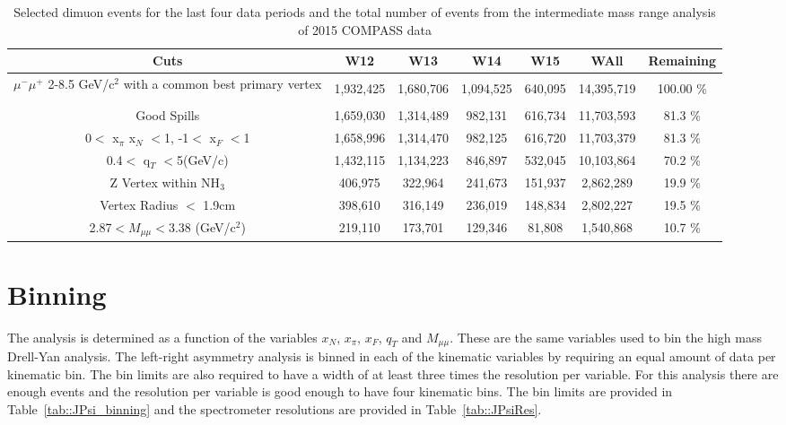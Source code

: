 \begin{table}[h!t]
  \begin{tabular}{ |c|c|c|c|c|c|c| }
    \hline \textbf{Cuts}& \textbf{W12}& \textbf{W13}& \textbf{W14}&
    \textbf{W15} & \textbf{WAll} & \textbf{Remaining} \\ \hline

    \multirow{3}{9em}{$\mu^-\mu^+$ 2-8.5 GeV/c$^2$ with a common best primary
      vertex}& & & & & & \\
    &1,932,425& 1,680,706& 1,094,525& 640,095& 14,395,719&
    100.00 \% \\ & & & & & & \\ \hline

    Good Spills& 1,659,030& 1,314,489& 982,131& 616,734& 11,703,593&
    81.3 \% \\ \hline

    0$<$ x$_{\pi}$ x$_N$ $<$1, -1$<$ x$_F$ $<$1&
    1,658,996& 1,314,470& 982,125& 616,720& 11,703,379&	81.3 \% \\ \hline

    0.4$<$ q$_T$ $<$5(GeV/c)&
    1,432,115& 1,134,223& 846,897& 532,045& 10,103,864&	70.2 \% \\ \hline

    Z Vertex within NH$_3$&
    406,975& 322,964& 241,673& 151,937&	2,862,289& 19.9  \% \\ \hline

    Vertex Radius $<$ 1.9cm&
    398,610& 316,149& 236,019& 148,834& 2,802,227& 19.5  \% \\ \hline

    2.87$< M_{\mu\mu} <$3.38 (GeV/c$^2$)&
    219,110& 173,701& 129,346& 81,808& 1,540,868& 10.7  \% \\ \hline
    
  \end{tabular}
  \caption{Selected dimuon events for the last four data periods and the total
    number of events from the intermediate mass range analysis of 2015 COMPASS
    data}
  \label{tab::JPsiStats2}
\end{table}


\section{Binning}

The analysis is determined as a function of the variables $x_N$, $x_{\pi}$,
$x_F$, $q_T$ and $M_{\mu\mu}$.  These are the same variables used to bin the
high mass Drell-Yan analysis.  The left-right asymmetry analysis is binned in
each of the kinematic variables by requiring an equal amount of data per
kinematic bin.  The bin limits are also required to have a width of at least
three times the resolution per variable.  For this analysis there are enough
events and the resolution per variable is good enough to have four kinematic
bins.  The bin limits are provided in Table~\ref{tab::JPsi_binning} and the
spectrometer resolutions are provided in Table~\ref{tab::JPsiRes}.


